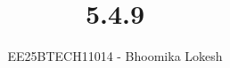 \documentclass[journal,onecolumn]{IEEEtran}
\begin{document}

\vspace{3cm}

\title{5.4.9}
\author{EE25BTECH11014 - Bhoomika Lokesh}
{\let\newpage\relax\maketitle}

\renewcommand{\thefigure}{\theenumi}
\renewcommand{\thetable}{\theenumi}
\setlength{\intextsep}{10pt} %

\renewcommand{\thetable}{\theenumi}
\end{document}
